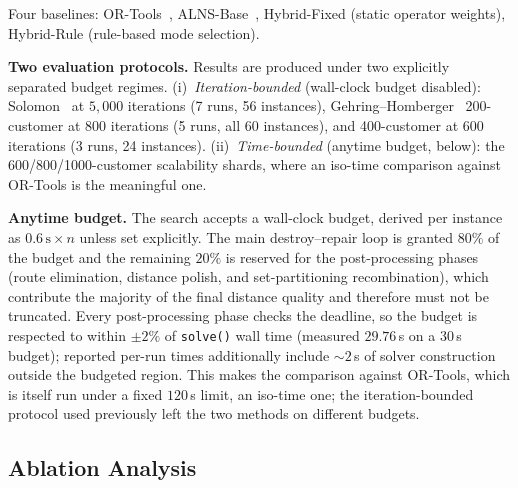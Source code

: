 \documentclass[conference]{IEEEtran}
\begin{document}
Four baselines: OR-Tools~\cite{ortools}, ALNS-Base~\cite{Ropke2006},
Hybrid-Fixed (static operator weights), Hybrid-Rule (rule-based mode
selection).

\textbf{Two evaluation protocols.} Results are produced under two explicitly
separated budget regimes. (i)~\emph{Iteration-bounded} (wall-clock budget
disabled): Solomon~\cite{Solomon1987} at $5{,}000$ iterations (7 runs, 56
instances), Gehring--Homberger~\cite{Gehring1999} 200-customer at $800$
iterations (5 runs, all 60 instances), and 400-customer at $600$ iterations
(3 runs, 24 instances). (ii)~\emph{Time-bounded} (anytime budget, below): the
600/800/1000-customer scalability shards, where an iso-time comparison against
OR-Tools is the meaningful one.

\textbf{Anytime budget.} The search accepts a wall-clock budget, derived per
instance as $0.6\,\text{s} \times n$ unless set explicitly. The main
destroy--repair loop is granted $80\%$ of the budget and the remaining $20\%$ is
reserved for the post-processing phases (route elimination, distance polish, and
set-partitioning recombination), which contribute the majority of the final
distance quality and therefore must not be truncated. Every post-processing
phase checks the deadline, so the budget is respected to within $\pm 2\%$ of
\texttt{solve()} wall time (measured $29.76$\,s on a $30$\,s budget); reported
per-run times additionally include ${\sim}2$\,s of solver construction outside
the budgeted region. This makes the comparison against OR-Tools, which is
itself run under a fixed $120$\,s limit, an iso-time one; the
iteration-bounded protocol used previously left the two methods on different
budgets.

\subsection{Ablation Analysis}
\end{document}
